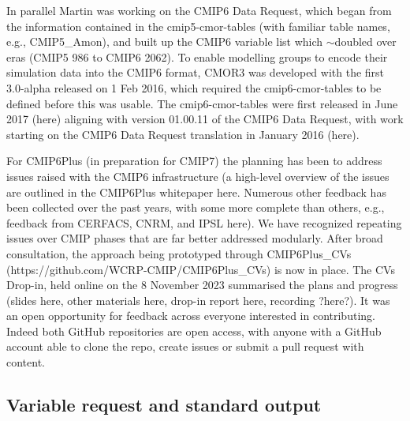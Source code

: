 \documentclass[manuscript]{copernicus}
\newcommand{\mycomment}[1]{}
\begin{document}
{In parallel Martin was working on the CMIP6 Data Request, which began from the information contained in the cmip5-cmor-tables (with familiar table names, e.g., CMIP5_Amon), and built up the CMIP6 variable list which $\sim$doubled over eras (CMIP5 986 to CMIP6 2062). To enable modelling groups to encode their simulation data into the CMIP6 format, CMOR3 was developed with the first 3.0-alpha released on 1 Feb 2016, which required the cmip6-cmor-tables to be defined before this was usable. The cmip6-cmor-tables were first released in June 2017 (here) aligning with version 01.00.11 of the CMIP6 Data Request, with work starting on the CMIP6 Data Request translation in January 2016 (here).

For CMIP6Plus (in preparation for CMIP7) the planning has been to address issues raised with the CMIP6 infrastructure (a high-level overview of the issues are outlined in the CMIP6Plus whitepaper here. Numerous other feedback has been collected over the past years, with some more complete than others, e.g., feedback from CERFACS, CNRM, and IPSL here). We have recognized repeating issues over CMIP phases that are far better addressed modularly. After broad consultation, the approach being prototyped through CMIP6Plus_CVs (https://github.com/WCRP-CMIP/CMIP6Plus_CVs) is now in place. The CVs Drop-in, held online on the 8 November 2023 summarised the plans and progress (slides here, other materials here, drop-in report here, recording ?here?). It was an open opportunity for feedback across everyone interested in contributing. Indeed both GitHub repositories are open access, with anyone with a GitHub account able to clone the repo, create issues or submit a pull request with content.
}


\subsection{Variable request and standard output}
\label{sec:CMIP6DR}
\mycomment{
Consider realm/frequency evolution across mip eras. RE: realm evolution, started in CMIP3 with tables (A1, O1, etc), built around the history files, from model components - so all ocean history files contained ocean, and sea ice variable, etc - Karl to augment; RE: frequencies, 3D fields, vs 2D fields were separated across tables as these had different temporal requests, to keep request sizes down; \autoref{tab:tab1-MIPsThroughTime} and \autoref{tab:tabAppB1-MIPStandardOutput}.
Old: A critical component MIP experimentation is specifying what simulation output to save. It is a trade-off between the efforts required by modelling groups to fulfill a request, available storage, and existing and potential future science needs. Despite advancing technology, saving everything (i.e., all prognostic variables at every timestep) has never been realistic. In AMIP1/2, CMIP1/2/2+/3/5, consideration was made in consultation with MIP chairs and modelling groups about what questions or analyses will be pursued with a given simulation that dictates how much data is saved.
As MIPs emerged, more scientists began analyzing simulations, and it was not always clear a priori what would be studied.
}
\end{document}
